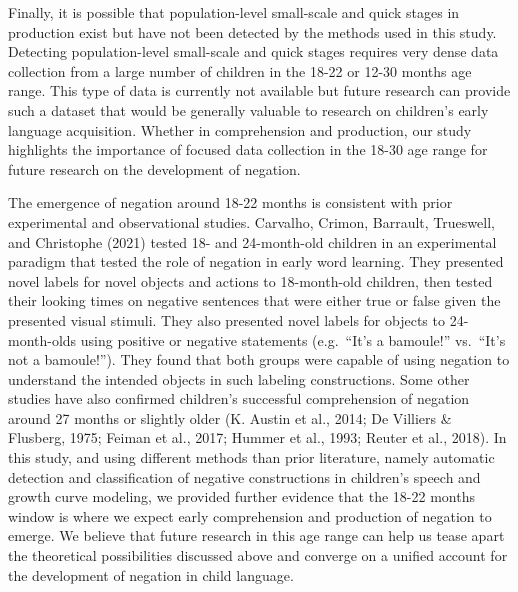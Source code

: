 \documentclass[
  man,floatsintext]{apa6}
\begin{document}
Finally, it is possible that population-level small-scale and quick stages in production exist but have not been detected by the methods used in this study. Detecting population-level small-scale and quick stages requires very dense data collection from a large number of children in the 18-22 or 12-30 months age range. This type of data is currently not available but future research can provide such a dataset that would be generally valuable to research on children's early language acquisition. Whether in comprehension and production, our study highlights the importance of focused data collection in the 18-30 age range for future research on the development of negation.

The emergence of negation around 18-22 months is consistent with prior experimental and observational studies. Carvalho, Crimon, Barrault, Trueswell, and Christophe (2021) tested 18- and 24-month-old children in an experimental paradigm that tested the role of negation in early word learning. They presented novel labels for novel objects and actions to 18-month-old children, then tested their looking times on negative sentences that were either true or false given the presented visual stimuli. They also presented novel labels for objects to 24-month-olds using positive or negative statements (e.g.~``It's a bamoule!'' vs.~``It's not a bamoule!''). They found that both groups were capable of using negation to understand the intended objects in such labeling constructions. Some other studies have also confirmed children's successful comprehension of negation around 27 months or slightly older (K. Austin et al., 2014; De Villiers \& Flusberg, 1975; Feiman et al., 2017; Hummer et al., 1993; Reuter et al., 2018). In this study, and using different methods than prior literature, namely automatic detection and classification of negative constructions in children's speech and growth curve modeling, we provided further evidence that the 18-22 months window is where we expect early comprehension and production of negation to emerge. We believe that future research in this age range can help us tease apart the theoretical possibilities discussed above and converge on a unified account for the development of negation in child language.
\end{document}
